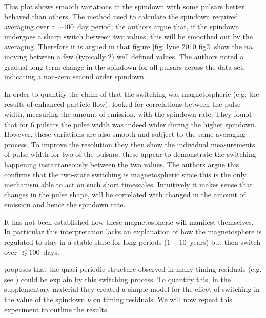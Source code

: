 This plot shows smooth variations in the spindown with some pulsars better
behaved than others. The method used to calculate the spindown required
averaging over a $\sim100$~day period; the authors argue that, if the spindown
undergoes a sharp switch between two values, this will be smoothed out by the
averaging.  Therefore it is argued in \citet{Lyne2010} that figure \ref{fig:
lyne 2010 fig2} show the $\dot{nu}$ moving between a few (typically 2) well
defined values.  The authors noted a gradual long-term change in the spindown
for all pulsars across the data set, indicating a non-zero second order
spindown. 

In order to quantify the claim of \citet{Kramer2006} that the switching was
magnetospheric (e.g. the results of enhanced particle flow), \citet{Lyne2010}
looked for correlations between the pulse width, measuring the amount of
emission, with the spindown rate.  They found that for 6 pulsars the pulse
width was indeed wider during the higher spindown. However, these variations
are also smooth and subject to the same averaging process. To improve the
resolution they then show the individual measurements of pulse width for two of
the pulsars; these appear to demonstrate the switching happening
instantaneously between the two values. The authors argue this confirms that
the two-state switching is magnetospheric since this is the only mechanism able
to act on such short timescales. Intuitively it makes sense that changes in
the pulse shape, will be correlated with changed in the amount of emission and 
hence the spindown rate. 

It has not been established how these magnetospheric will manifest themselves.
In particular this interpretation lacks an explanation of how the magnetosphere is
regulated to stay in a stable state for long periods ($1-10$~years) but then
switch over $\lesssim100$~days.

\citet{Lyne2010} proposes that the quasi-periodic structure observed in many
timing residuals (e.g. see \citet{Hobbs2010}) could be explain by this
switching process. To quantify this, in the supplementary material they created
a simple model for the effect of switching in the value of the spindown
$\dot{\nu}$ on timing residuals. We will now repeat this experiment to outline
the results. 

